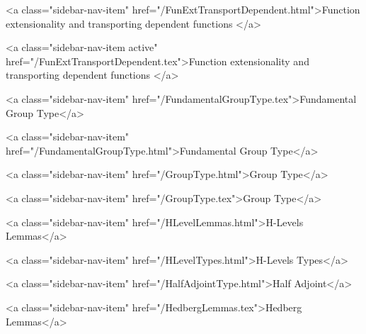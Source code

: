       
    
      
        
          <a class="sidebar-nav-item" href="/FunExtTransportDependent.html">Function extensionality and transporting dependent functions </a>
        
      
    
      
        
          <a class="sidebar-nav-item active" href="/FunExtTransportDependent.tex">Function extensionality and transporting dependent functions </a>
        
      
    
      
        
          <a class="sidebar-nav-item" href="/FundamentalGroupType.tex">Fundamental Group Type</a>
        
      
    
      
        
          <a class="sidebar-nav-item" href="/FundamentalGroupType.html">Fundamental Group Type</a>
        
      
    
      
        
          <a class="sidebar-nav-item" href="/GroupType.html">Group Type</a>
        
      
    
      
        
          <a class="sidebar-nav-item" href="/GroupType.tex">Group Type</a>
        
      
    
      
        
          <a class="sidebar-nav-item" href="/HLevelLemmas.html">H-Levels Lemmas</a>
        
      
    
      
        
          <a class="sidebar-nav-item" href="/HLevelTypes.html">H-Levels Types</a>
        
      
    
      
        
          <a class="sidebar-nav-item" href="/HalfAdjointType.html">Half Adjoint</a>
        
      
    
      
        
          <a class="sidebar-nav-item" href="/HedbergLemmas.tex">Hedberg Lemmas</a>
        
      
    
      
        
